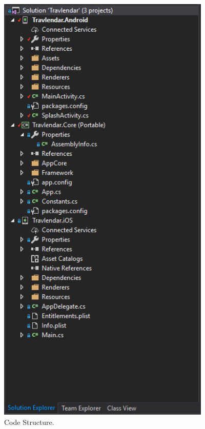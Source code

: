 \begin{figure}
	\centering
	\includegraphics[width=4in]{./images/code_structure.png}
	\caption{Code Structure.}
	\label{fig:structure}
\end{figure}
